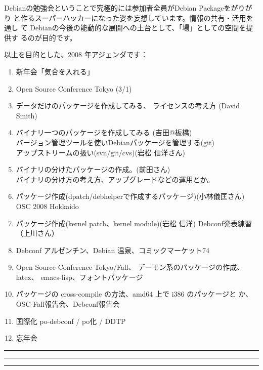 \documentclass[mingoth,a4paper]{jsarticle}
\begin{document}
 Debianの勉強会ということで究極的には参加者全員がDebian Packageをがりがり
 と作るスーパーハッカーになった姿を妄想しています。情報の共有・活用を通し
 て Debianの今後の能動的な展開への土台として、「場」としての空間を提供す
 るのが目的です。

以上を目的とした、2008 年アジェンダです：
\begin{enumerate}
 \item 新年会「気合を入れる」
 \item Open Source Conference Tokyo (3/1)
 \item データだけのパッケージを作成してみる、
       ライセンスの考え方 (David Smith)
 \item バイナリ一つのパッケージを作成してみる (吉田@板橋)\\
       バージョン管理ツールを使いDebianパッケージを管理する(git)\\
       アップストリームの扱い(svn/git/cvs)(岩松 信洋さん)
 \item バイナリの分けたパッケージの作成。(前田さん)\\
       バイナリの分け方の考え方、アップグレードなどの運用とか。
 \item パッケージ作成(dpatch/debhelperで作成するパッケージ)(小林儀匡さん)\\
       OSC 2008 Hokkaido
 \item パッケージ作成(kernel patch、kernel module)(岩松 信洋)
       Debconf発表練習（上川さん）

 \item Debconf アルゼンチン、Debian 温泉、コミックマーケット74

 \item Open Source Conference Tokyo/Fall、
       デーモン系のパッケージの作成、latex、 emacs-lisp、フォントパッケージ
 \item パッケージの cross-compile の方法、amd64 上で i386 のパッケージと
       か、OSC-Fall報告会、Debconf報告会
 \item 国際化 po-debconf / po化 / DDTP
 \item 忘年会
\end{enumerate}


\newpage

\begin{minipage}[b]{0.2\hsize}
 \colorbox{titleback}{}
\end{minipage}
\begin{minipage}[b]{0.8\hsize}
\hrule
\vspace{2mm}
\hrule
\tableofcontents
\vspace{2mm}
\hrule
\end{minipage}
\end{document}
